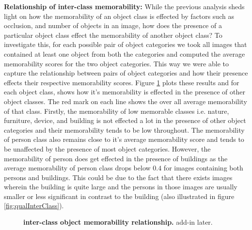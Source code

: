 \textbf{Relationship of inter-class memorability:} While the previous analysis sheds light on how the memorability of an object class is effected by factors such as occlusion, and number of objects in an image, how does the presence of a particular object class effect the memorability of another object class? To investigate this, for each possible pair of object categories we took all images that contained at least one object from both the categories and computed the average memorability scores for the two object categories. This way we were able to capture the relationship between pairs of object categories and how their presence effects their respective memorability scores. Figure \ref{fig:obLabelPair} plots these results and for each object class, shows how it's memorability is effected in the presence of other object classes. The red mark on each line shows the over all average memorability of that class. Firstly, the memorability of low memorable classes i.e. nature, furniture, device, and building is not effected a lot in the presence of other object categories and their memorability tends to be low throughout. The memorability of person class also remains close to it's average memorability score and tends to be unaffected by the presence of most object categories. However, the memorability of person does get effected in the presence of buildings as the average memorability of person class drops below $0.4$ for images containing both persons and buildings. This could be due to the fact that there exists images wherein the building is quite large and the persons in those images are usually smaller or less significant in contrast to the building (also illustrated in figure \ref{fig:qualInterClass}). 

\begin{figure}[h]
\centering
{}
\vspace{-5mm}\caption{\footnotesize\textbf{inter-class object memorability relationship.} add-in later. }\label{fig:obLabelPair}
\end{figure}

